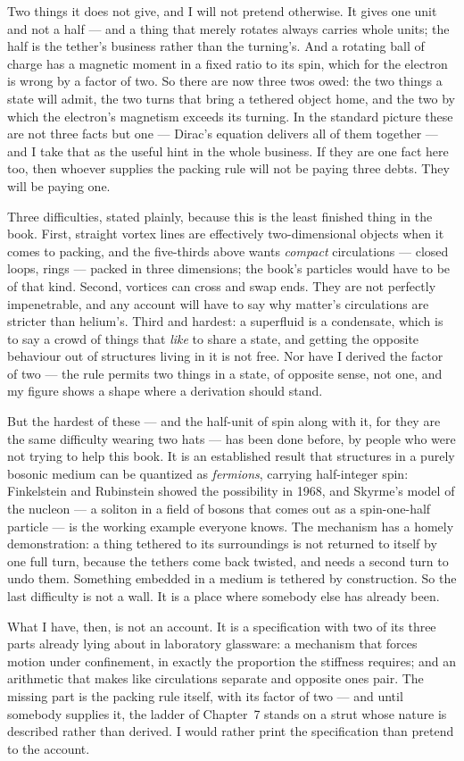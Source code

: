 Two things it does not give, and I will not pretend otherwise. It gives one unit and not a half --- and a thing that merely rotates always carries whole units; the half is the tether's business rather than the turning's. And a rotating ball of charge has a magnetic moment in a fixed ratio to its spin, which for the electron is wrong by a factor of two. So there are now three twos owed: the two things a state will admit, the two turns that bring a tethered object home, and the two by which the electron's magnetism exceeds its turning. In the standard picture these are not three facts but one --- Dirac's equation delivers all of them together --- and I take that as the useful hint in the whole business. If they are one fact here too, then whoever supplies the packing rule will not be paying three debts. They will be paying one.


Three difficulties, stated plainly, because this is the least finished thing in the book. First, straight vortex lines are effectively two-dimensional objects when it comes to packing, and the five-thirds above wants \emph{compact} circulations --- closed loops, rings --- packed in three dimensions; the book's particles would have to be of that kind. Second, vortices can cross and swap ends. They are not perfectly impenetrable, and any account will have to say why matter's circulations are stricter than helium's. Third and hardest: a superfluid is a condensate, which is to say a crowd of things that \emph{like} to share a state, and getting the opposite behaviour out of structures living in it is not free. Nor have I derived the factor of two --- the rule permits two things in a state, of opposite sense, not one, and my figure shows a shape where a derivation should stand.

But the hardest of these --- and the half-unit of spin along with it, for they are the same difficulty wearing two hats --- has been done before, by people who were not trying to help this book. It is an established result that structures in a purely bosonic medium can be quantized as \emph{fermions}, carrying half-integer spin: Finkelstein and Rubinstein showed the possibility in 1968, and Skyrme's model of the nucleon --- a soliton in a field of bosons that comes out as a spin-one-half particle --- is the working example everyone knows. The mechanism has a homely demonstration: a thing tethered to its surroundings is not returned to itself by one full turn, because the tethers come back twisted, and needs a second turn to undo them. Something embedded in a medium is tethered by construction. So the last difficulty is not a wall. It is a place where somebody else has already been.

What I have, then, is not an account. It is a specification with two of its three parts already lying about in laboratory glassware: a mechanism that forces motion under confinement, in exactly the proportion the stiffness requires; and an arithmetic that makes like circulations separate and opposite ones pair. The missing part is the packing rule itself, with its factor of two --- and until somebody supplies it, the ladder of Chapter~7 stands on a strut whose nature is described rather than derived. I would rather print the specification than pretend to the account.

